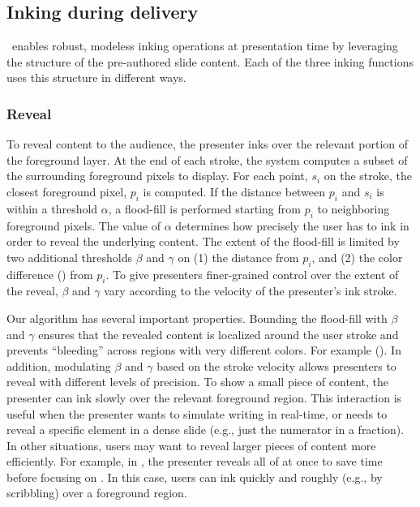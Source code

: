 \subsection{Inking during delivery}
%
\interface\ enables robust, modeless inking operations at presentation time by leveraging the structure of the pre-authored slide content. Each of the three inking functions uses this structure in different ways. 

\subsubsection{Reveal}
To reveal content to the audience, the presenter inks over the relevant portion of the foreground layer.
%
At the end of each stroke, the system computes a subset of the surrounding foreground pixels to display. 
%
For each point, $s_i$ on the stroke, the closest foreground pixel, $p_i$ is computed. If the distance between $p_i$ and $s_i$ is within a threshold $\alpha$, a flood-fill is performed starting from $p_i$ to neighboring foreground pixels. The value of $\alpha$ determines how precisely the user has to ink in order to reveal the underlying content. 
%
The extent of the flood-fill is limited by two additional thresholds $\beta$ and $\gamma$ on (1) the distance from $p_i$, and (2) the color difference () from $p_i$. 
%
To give presenters finer-grained control over the extent of the reveal, $\beta$ and $\gamma$ vary according to the velocity of the presenter's ink stroke.  

Our algorithm has several important properties. Bounding the flood-fill with $\beta$ and $\gamma$ ensures that the revealed content is localized around the user stroke and prevents ``bleeding'' across regions with very different colors. For example (). 
%
In addition, modulating $\beta$ and $\gamma$ based on the stroke velocity allows presenters to reveal with different levels of precision. 
%
To show a small piece of content, the presenter can ink slowly over the relevant foreground region. This interaction is useful when the presenter wants to simulate writing in real-time, or needs to reveal a specific element in a dense slide (e.g., just the numerator in a fraction). 
%
In other situations, users may want to reveal larger pieces of content more efficiently. For example, in , the presenter reveals all of  at once to save time before focusing on . In this case, users can ink quickly and roughly (e.g., by scribbling) over a foreground region.


